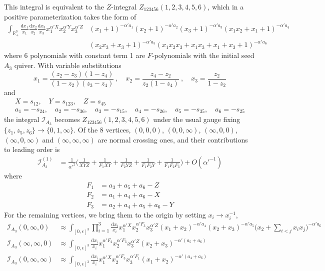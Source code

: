 \documentclass[12pt]{article}
\theoremstyle{definition}
\theoremstyle{plain}
\newcommand{\dif}{\mathrm{d}} %
\begin{document}
This integral is equivalent to the $Z$-integral $Z_{123456}(1,2,3,4,5,6)$, which in a positive parameterization takes the form of 
\begin{align*}
	\int_{\mathbb R_+^3} \frac{\dif x_1}{x_1}\frac{\dif x_2}{x_2}\frac{\dif x_3}{x_3}
	x_1^{\alpha' X}x_2^{\alpha' Y}x_3^{\alpha' Z}
	&(x_1 + 1)^{-\alpha' a_1}
	(x_2 + 1)^{-\alpha'a_2}
	(x_3 + 1)^{-\alpha'a_3}
	(x_1x_2 + x_1 + 1)^{-\alpha'a_4}\\
	&(x_2x_3 + x_3 + 1)^{-\alpha'a_5}
	(x_1x_2x_3 + x_1x_3 + x_1 + x_3 + 1)^{-\alpha'a_6}
\end{align*}
where 6 polynomials with constant term 1 are $F$-polynomials with the initial seed $A_{3}$ quiver. With variable substitutions
\[
x_{1}=\frac{(z_{2}-z_{3})(1-z_{4})}{(1-z_{2})(z_{3}-z_{4})}\:,\quad x_{2}=\frac{z_{4}-z_{2}}{z_{2}(1-z_{4})}\:, \quad
x_{3}=\frac{z_{2}}{1-z_{2}}
\]
and
\begin{gather*}
	X=s_{12},\quad Y=s_{123},\quad Z=s_{45} \\
	a_{1}=-s_{24},\quad a_{2}=-s_{36},\quad a_{3}=-s_{15},\quad a_{4}=-s_{26},\quad a_{5}=-s_{35},\quad a_{6}=-s_{25}	
\end{gather*}
the integral $\mathcal{I}_{A_{3}}$ becomes $Z_{123456}(1,2,3,4,5,6)$ under the usual gauge fixing $\{z_{1},z_{5},z_{6}\}\to\{0,1,\infty\}$. Of the 8 vertices, $(0,0,0)$, $(0,0,\infty)$, $(\infty,0,0)$, $(\infty,0,\infty)$ and $(\infty,\infty,\infty)$ are normal crossing ones, and their contributions to leading order is 
\begin{align*}
	\mathcal{I}_{A_{3}}^{(1)}&=\frac{1}{\alpha'^{2}}\biggl(\frac{1}{XYZ}+\frac{1}{F_{1}XY} +\frac{1}{F_{2}YZ}+\frac{1}{F_{1}F_{2}Y} 
	+\frac{1}{F_{1}F_{2}F_{3}}\biggr) +O(\alpha'^{-1})
\end{align*}	
where
\begin{align*}
	F_{1} &= a_{3}+a_{5}+a_{6}-Z \\
	F_{2} &= a_{1}+a_{4}+a_{6}-X \\
	F_{3} &= a_{2}+a_{4}+a_{5}+a_{6}-Y
\end{align*}
For the remaining vertices, we bring them to the origin by setting $x_{i}\to x_{i}^{-1}$,
\begin{align*}
	\mathcal{I}_{A_{3}}(0,\infty,0)&\approx\int_{[0,\epsilon]^{3}}\prod_{i=1}^{3}\frac{\dif x_{i}}{x_{i}} x_{1}^{\alpha' X}
	x_{2}^{\alpha' F_{3}}x_{3}^{\alpha' Z}(x_{1}+x_{2})^{-\alpha' a_{4}}(x_{2}+x_{3})^{-\alpha' a_{5}}
	\biggl(x_{2}+\sum_{i<j} x_{i}x_{j}\biggr)^{-\alpha' a_{6}} \\
	\mathcal{I}_{A_{3}}(\infty,\infty,0)&\approx \int_{[0,\epsilon]^{3}}\frac{\dif x_{i}}{x_{i}}x_{1}^{\alpha' F_{2}}x_{2}^{\alpha' F_{3}}x_{3}^{\alpha'Z} (x_{2}+x_{3})^{-\alpha'(a_{5}+a_{6})} \\
	\mathcal{I}_{A_{3}}(0,\infty,\infty)&\approx \int_{[0,\epsilon]^{3}}\frac{\dif x_{i}}{x_{i}}x_{1}^{\alpha' X}x_{2}^{\alpha' F_{3}}x_{3}^{\alpha' F_{1}} (x_{1}+x_{2})^{-\alpha'(a_{4}+a_{6})}
\end{align*}
\end{document}
